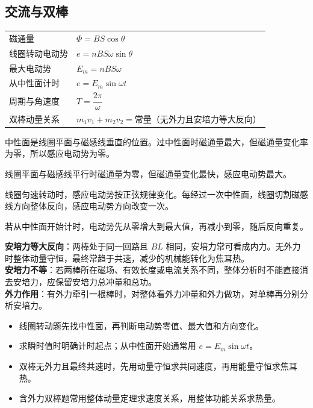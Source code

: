 
\subsection{交流与双棒}

\begin{tabularx}{\columnwidth}{XX}
  磁通量&$\Phi=BS\cos\theta$\\
  线圈转动电动势&$e=nBS\omega\sin\theta$\\
  最大电动势&$E_m=nBS\omega$\\
  从中性面计时&$e=E_m\sin\omega t$\\
  周期与角速度&$T=\dfrac{2\pi}{\omega}$\\
  双棒动量关系&$m_1v_1+m_2v_2=\text{常量}$（无外力且安培力等大反向）\\
\end{tabularx}

\begin{formulanotebox}
中性面是线圈平面与磁感线垂直的位置。过中性面时磁通量最大，但磁通量变化率为零，所以感应电动势为零。

线圈平面与磁感线平行时磁通量为零，但磁通量变化最快，感应电动势最大。
\end{formulanotebox}

\begin{keypointbox}[title={\strut\textcolor{white}{\bfseries 重点知识点：交流电产生}}]
线圈匀速转动时，感应电动势按正弦规律变化。每经过一次中性面，线圈切割磁感线方向整体反向，感应电动势方向改变一次。

若从中性面开始计时，电动势先从零增大到最大值，再减小到零，随后反向重复。
\end{keypointbox}

\begin{keypointbox}[title={\strut\textcolor{white}{\bfseries 重点知识点：双棒模型}}]
\textbf{安培力等大反向}：两棒处于同一回路且 $BL$ 相同，安培力常可看成内力。无外力时整体动量守恒，最终常趋于共速，减少的机械能转化为焦耳热。\\

\textbf{安培力不等}：若两棒所在磁场、有效长度或电流关系不同，整体分析时不能直接消去安培力，应保留安培力总冲量和总功。\\

\textbf{外力作用}：有外力牵引一根棒时，对整体看外力冲量和外力做功，对单棒再分别分析安培力。
\end{keypointbox}

\begin{casetypebox}[title={\strut\textcolor{white}{\bfseries 常见题型：线圈转动与双棒综合}}]
\begin{itemize}[leftmargin=1.5em]
  \item 线圈转动题先找中性面，再判断电动势零值、最大值和方向变化。
  \item 求瞬时值时明确计时起点；从中性面开始通常用 $e=E_m\sin\omega t$。
  \item 双棒无外力且最终共速时，先用动量守恒求共同速度，再用能量守恒求焦耳热。
  \item 含外力双棒题常用整体动量定理求速度关系，用整体功能关系求热量。
\end{itemize}
\end{casetypebox}
